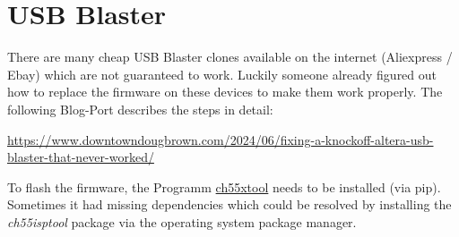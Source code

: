 \chapter{USB Blaster}

There are many cheap USB Blaster clones available on the internet (Aliexpress / Ebay) which are not guaranteed to work. Luckily someone already figured out how to replace the firmware on these devices to make them work properly. The following Blog-Port describes the steps in detail:

\href{https://www.downtowndougbrown.com/2024/06/fixing-a-knockoff-altera-usb-blaster-that-never-worked/}{https://www.downtowndougbrown.com/2024/06/fixing-a-knockoff-altera-usb-blaster-that-never-worked/}

To flash the firmware, the Programm \href{https://pypi.org/project/ch55xtool/}{ch55xtool} needs to be installed (via pip). Sometimes it had missing dependencies which could be resolved by installing the \textit{ch55isptool} package via the operating system package manager.
